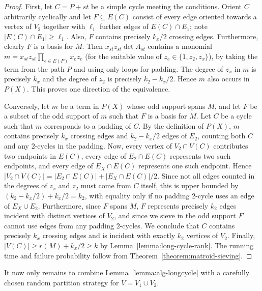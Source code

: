 \documentclass[10pt,a4paper]{article}
\begin{document}
\begin{proof}
  First, let $C=P+st$ be a simple cycle meeting the conditions.
  Orient $C$ arbitrarily cyclically and let $F \subseteq E(C)$
  consist of every edge oriented towards a vertex of $V_2$
  together with $\ell_1$ further edges of $E(C) \cap E_1$;
  note $|E(C) \cap E_1| \geq \ell_1$.
  Also, $F$ contains precisely $k_x/2$ crossing edges.
  Furthermore, clearly $F$ is a basis for $M$. 
  Then $x_{st}z_{st} \det A_{st}$ contains a monomial $m=x_{st}z_{st} \prod_{e \in E(P)} x_ez_e$
  (for the suitable value of $z_e \in \{1, z_2, z_x\}$),
  by taking the term from the path $P$ and using only loops for padding.
  The degree of $z_x$ in $m$ is precisely $k_x$
  and the degree of $z_2$ is precisely $k_2-k_x/2$.
  Hence $m$ also occurs in $P(X)$. This proves one direction of the equivalence.

  Conversely, let $m$ be a term in $P(X)$ whose odd support spans $M$,
  and let $F$ be a subset of the odd support of $m$ such that $F$ is a
  basis for $M$. Let $C$ be a cycle such that $m$ corresponds to a
  padding of $C$. By the definition of $P(X)$, $m$ contains precisely $k_x$ crossing
  edges and $k_2-k_x/2$ edges of $E_2$, counting both $C$ and any
  2-cycles in the padding. Now, every vertex of $V_2 \cap V(C)$
  contributes two endpoints in $E(C)$, every edge of $E_2 \cap E(C)$
  represents two such endpoints, and every edge of $E_X \cap E(C)$
  represents one such endpoint. Hence
  $|V_2 \cap V(C)|=|E_2 \cap E(C)|+|E_X \cap E(C)|/2$. 
  Since not all edges counted in the degrees of $z_x$ and $z_2$ must
  come from $C$ itself, this is upper bounded by $(k_2-k_x/2) + k_x/2=k_2$, 
  with equality only if no padding 2-cycle uses an edge of $E_X \cup E_2$.
  Furthermore, since $F$ spans $M$, $F$ represents precisely $k_2$ 
  edges incident with distinct vertices of $V_2$, and since we sieve
  in the odd support $F$ cannot use edges from any padding 2-cycles.
  We conclude that $C$ contains precisely $k_x$ crossing edges and
  is incident with exactly $k_2$ vertices of $V_2$.
  Finally, $|V(C)| \geq r(M)+k_x/2 \geq k$ by Lemma~\ref{lemma:long-cycle-rank}.
  The running time and failure probability follow from Theorem~\ref{theorem:matroid-sieving}.
\end{proof}

It now only remains to combine Lemma~\ref{lemma:alg-longcycle} with a
carefully chosen random partition strategy for $V=V_1 \cup V_2$.
\end{document}
